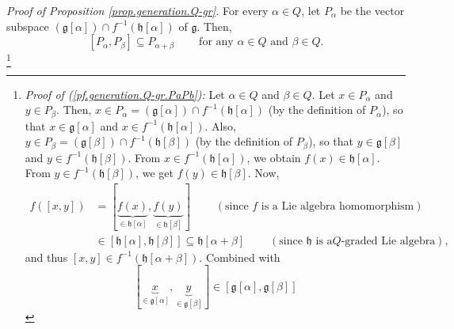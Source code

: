 \documentclass[etingof-lie.tex]{subfiles}
\begin{document}
\begin{verlong}
\textit{Proof of Proposition \ref{prop.generation.Q-gr}.} For every $\alpha\in
Q$, let $P_{\alpha}$ be the vector subspace $\left(  \mathfrak{g}\left[
\alpha\right]  \right)  \cap f^{-1}\left(  \mathfrak{h}\left[  \alpha\right]
\right)  $ of $\mathfrak{g}$. Then,%
\begin{equation}
\left[  P_{\alpha},P_{\beta}\right]  \subseteq P_{\alpha+\beta}%
\ \ \ \ \ \ \ \ \ \ \text{for any }\alpha\in Q\text{ and }\beta\in Q.
\label{pf.generation.Q-gr.PaPb}%
\end{equation}
\footnote{\textit{Proof of (\ref{pf.generation.Q-gr.PaPb}):} Let $\alpha\in Q$
and $\beta\in Q$. Let $x\in P_{\alpha}$ and $y\in P_{\beta}$. Then, $x\in
P_{\alpha}=\left(  \mathfrak{g}\left[  \alpha\right]  \right)  \cap
f^{-1}\left(  \mathfrak{h}\left[  \alpha\right]  \right)  $ (by the definition
of $P_{\alpha}$), so that $x\in\mathfrak{g}\left[  \alpha\right]  $ and $x\in
f^{-1}\left(  \mathfrak{h}\left[  \alpha\right]  \right)  $. Also, $y\in
P_{\beta}=\left(  \mathfrak{g}\left[  \beta\right]  \right)  \cap
f^{-1}\left(  \mathfrak{h}\left[  \beta\right]  \right)  $ (by the definition
of $P_{\beta}$), so that $y\in\mathfrak{g}\left[  \beta\right]  $ and $y\in
f^{-1}\left(  \mathfrak{h}\left[  \beta\right]  \right)  $. From $x\in
f^{-1}\left(  \mathfrak{h}\left[  \alpha\right]  \right)  $, we obtain
$f\left(  x\right)  \in\mathfrak{h}\left[  \alpha\right]  $. From $y\in
f^{-1}\left(  \mathfrak{h}\left[  \beta\right]  \right)  $, we get $f\left(
y\right)  \in\mathfrak{h}\left[  \beta\right]  $. Now,%
\begin{align*}
f\left(  \left[  x,y\right]  \right)   &  =\left[  \underbrace{f\left(
x\right)  }_{\in\mathfrak{h}\left[  \alpha\right]  },\underbrace{f\left(
y\right)  }_{\in\mathfrak{h}\left[  \beta\right]  }\right]
\ \ \ \ \ \ \ \ \ \ \left(  \text{since }f\text{ is a Lie algebra
homomorphism}\right) \\
&  \in\left[  \mathfrak{h}\left[  \alpha\right]  ,\mathfrak{h}\left[
\beta\right]  \right]  \subseteq\mathfrak{h}\left[  \alpha+\beta\right]
\ \ \ \ \ \ \ \ \ \ \left(  \text{since }\mathfrak{h}\text{ is a
}Q\text{-graded Lie algebra}\right)  ,
\end{align*}
and thus $\left[  x,y\right]  \in f^{-1}\left(  \mathfrak{h}\left[
\alpha+\beta\right]  \right)  $. Combined with%
\[
\left[  \underbrace{x}_{\in\mathfrak{g}\left[  \alpha\right]  },\underbrace{y}%
_{\in\mathfrak{g}\left[  \beta\right]  }\right]  \in\left[  \mathfrak{g}%
\left[  \alpha\right]  ,\mathfrak{g}\left[  \beta\right]  \right]
\]}
\end{verlong}
\end{document}
